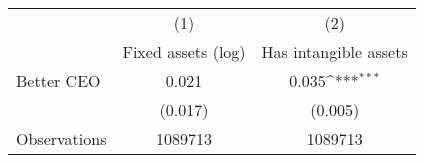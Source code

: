 {
\def\sym#1{\ifmmode^{#1}\else\(^{#1}\)\fi}
\begin{tabular}{l*{2}{c}}
\hline\hline
                    &\multicolumn{1}{c}{(1)}&\multicolumn{1}{c}{(2)}\\
                    &\multicolumn{1}{c}{Fixed assets (log)}&\multicolumn{1}{c}{Has intangible assets}\\
\hline
Better CEO          &       0.021         &       0.035\sym{***}\\
                    &     (0.017)         &     (0.005)         \\
\hline
Observations        &     1089713         &     1089713         \\
\hline\hline
\end{tabular}
}
